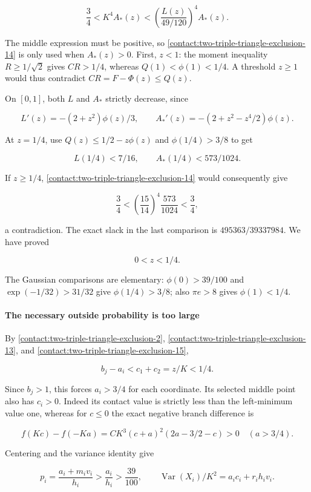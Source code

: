 \[
 \frac34<K^4A_*(z)
       <\left(\frac{L(z)}{49/120}\right)^4A_*(z).
\tag{B.20.14}\label{contact:two-triple-triangle-exclusion-14}
\]

The middle expression must be positive, so \eqref{contact:two-triple-triangle-exclusion-14} is only used when
$A_*(z)>0$. First, $z<1$: the moment inequality $R\ge 1/\sqrt{2}$ gives
$CR>1/4$, whereas $Q(1)<\phi(1)<1/4$. A threshold $z\ge 1$ would thus
contradict $CR=F-\Phi(z)\le Q(z)$.

On $[0,1]$, both $L$ and $A_*$ strictly decrease, since

\[
 L'(z)=-(2+z^2)\phi(z)/3,
 \qquad
 A_*'(z)=-(2+z^2-z^4/2)\phi(z).
\]

At $z=1/4$, use $Q(z)\le 1/2-z \phi(z)$ and $\phi(1/4)>3/8$ to get

\[
 L(1/4)<7/16,
 \qquad A_*(1/4)<573/1024.
\]

If $z\ge 1/4$, \eqref{contact:two-triple-triangle-exclusion-14} would consequently give

\[
 \frac34<\left(\frac{15}{14}\right)^4\frac{573}{1024}<\frac34,
\]

a contradiction. The exact slack in the last comparison is
$495363/39337984$. We have proved

\[
 \boxed{\quad0<z<1/4.\quad}
\tag{B.20.15}\label{contact:two-triple-triangle-exclusion-15}
\]

The Gaussian comparisons are elementary: $\phi(0)>39/100$ and
$\exp(-1/32)>31/32$ give $\phi(1/4)>3/8$; also $\pi e>8$ gives
$\phi(1)<1/4$.

\paragraph{The necessary outside probability is too large}

By \eqref{contact:two-triple-triangle-exclusion-2}, \eqref{contact:two-triple-triangle-exclusion-13}, and \eqref{contact:two-triple-triangle-exclusion-15},

\[
 b_j-a_i<c_1+c_2=z/K<1/4.
\]

Since $b_j>1$, this forces $a_i>3/4$ for each coordinate. Its selected
middle point also has $c_i>0$. Indeed its contact value is strictly less
than the left-minimum value one, whereas for $c\le 0$ the exact negative
branch difference is

\[
 f(Kc)-f(-Ka)=CK^3(c+a)^2(2a-3/2-c)>0
 \quad(a>3/4).
\]

Centering and the variance identity give

\[
 p_i=\frac{a_i+m_iv_i}{h_i}>\frac{a_i}{h_i}>\frac{39}{100},
 \qquad
 \operatorname{Var}(X_i)/K^2=a_ic_i+r_i h_iv_i.
\tag{B.20.16}\label{contact:two-triple-triangle-exclusion-16}
\]

